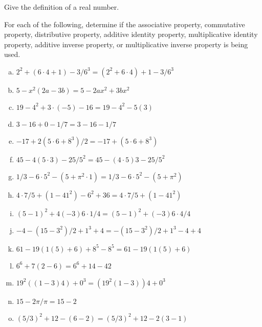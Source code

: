 \documentclass[11pt,letterpaper]{article}
\begin{document}

 Give the definition of a real number. 



\vfill



 For each of the following, determine if the associative property, commutative property, distributive property, additive identity property, multiplicative identity property, additive inverse property, or multiplicative inverse property is being used. \pvspace{0.2cm}

\begin{enumerate}[(a)] \itemsep=2ex
        \item \uans{6cm} \qquad $2^2 + (6 \cdot 4 + 1) - 3/6^3 = (2^2 + 6 \cdot 4) + 1 - 3/6^3$
        \item \uans{6cm} \qquad $5 - x^2 (2a - 3b) = 5- 2ax^2 + 3bx^2$
        \item \uans{6cm} \qquad $19 - 4^2 + 3 \cdot (-5) - 16 = 19 - 4^2 - 5 (3)$
        \item \uans{6cm} \qquad $3 - 16 + 0 -1/7 = 3 - 16 - 1/7$
        \item \uans{6cm} \qquad $-17 + 2(5 \cdot 6 + 8^3)/2 = -17 + (5 \cdot 6 + 8^3)$
        \item \uans{6cm} \qquad $45 - 4(5 \cdot 3) - 25/5^2 = 45 - (4 \cdot 5)3 - 25/5^2$
        \item \uans{6cm} \qquad $1/3 - 6 \cdot 5^2 - (5 + \pi^2 \cdot 1) = 1/3 - 6 \cdot 5^2 - (5 + \pi^2)$
        \item \uans{6cm} \qquad $4 \cdot 7/5 + (1 - 41^2) - 6^2 + 36 = 4 \cdot 7/5 + (1 - 41^2)$
        \item \uans{6cm} \qquad $(5 - 1)^2 + 4(-3)6 \cdot 1/4 = (5 - 1)^2 + (-3)6 \cdot 4/4$
        \item \uans{6cm} \qquad $-4 - (15 - 3^2)/2 + 1^3 + 4 = - (15 - 3^2)/2 + 1^3 - 4 + 4$
        \item \uans{6cm} \qquad $61 - 19( 1(5) + 6) + 8^5 - 8^5 = 61 - 19( 1(5) + 6)$
        \item \uans{6cm} \qquad $6^6 + 7(2 - 6) = 6^6 + 14 - 42$
        \item \uans{6cm} \qquad $19^2 ((1 - 3)4) + 0^3 = (19^2 (1 - 3))4 + 0^3$
        \item \uans{6cm} \qquad $15 - 2\pi/\pi = 15 - 2$
        \item \uans{6cm} \qquad $(5/3)^2 + 12 - (6 - 2) = (5/3)^2 + 12 - 2(3 - 1)$
        \end{enumerate}
\end{document}

